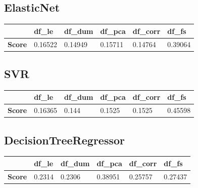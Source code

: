 \subsection{ElasticNet}
\begin{table}[H]
\begin{tabular}{l|l|l|l|l|l|}
\cline{2-6}
                                    & \textbf{df\_le} & \textbf{df\_dum} & \textbf{df\_pca} & \textbf{df\_corr} & \textbf{df\_fs} \\ \hline
\multicolumn{1}{|l|}{\textbf{Score}} & 0.16522         & 0.14949           & 0.15711          & 0.14764           & 0.39064         \\ \hline
\end{tabular}
\end{table}







\subsection{SVR}
\begin{table}[H]
\begin{tabular}{l|l|l|l|l|l|}
\cline{2-6}
                                    & \textbf{df\_le} & \textbf{df\_dum} & \textbf{df\_pca} & \textbf{df\_corr} & \textbf{df\_fs} \\ \hline
\multicolumn{1}{|l|}{\textbf{Score}} & 0.16365         & 0.144           & 0.1525          & 0.1525           & 0.45598         \\ \hline
\end{tabular}
\end{table}








\newpage

\subsection{DecisionTreeRegressor}
\begin{table}[H]
\begin{tabular}{l|l|l|l|l|l|}
\cline{2-6}
                                    & \textbf{df\_le} & \textbf{df\_dum} & \textbf{df\_pca} & \textbf{df\_corr} & \textbf{df\_fs} \\ \hline
\multicolumn{1}{|l|}{\textbf{Score}} & 0.2314         & 0.2306           & 0.38951          & 0.25757           & 0.27437         \\ \hline
\end{tabular}
\end{table}


